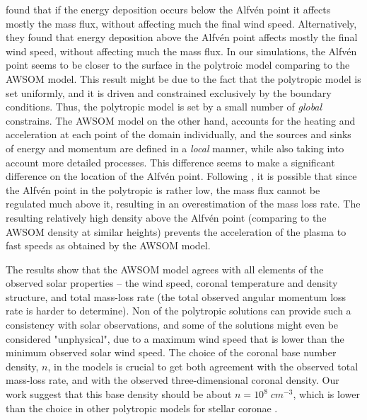 \documentclass[apj]{emulateapj}
\begin{document}
\cite{LeerHolzer80} found that if the energy deposition occurs below the Alfv\'en point it affects mostly the mass flux, without affecting much the final wind speed. Alternatively, they found that energy deposition above the Alfv\'en point affects mostly the final wind speed, without affecting much the mass flux. In our simulations, the Alfv\'en point seems to be closer to the surface in the polytroic model comparing to the AWSOM model. This result might be due to the fact that the polytropic model is set uniformly, and it is driven and constrained exclusively by the boundary conditions. Thus, the polytropic model is set by a small number of {\it global} constrains. The AWSOM model on the other hand, accounts for the heating and acceleration at each point of the domain individually, and the sources and sinks of energy and momentum are defined in a {\it local} manner, while also taking into account more detailed processes. This difference seems to make a significant difference on the location of the Alfv\'en point. Following \cite{LeerHolzer80}, it is possible that since the Alfv\'en point in the polytropic is rather low, the mass flux cannot be regulated much above it, resulting in an overestimation of the mass loss rate. The resulting relatively high density above the Alfv\'en point (comparing to the AWSOM density at similar heights) prevents the acceleration of the plasma to fast speeds as obtained by the AWSOM model.

The results show that the AWSOM model agrees with all elements of the observed solar properties -- the wind speed, coronal temperature and density structure, and total mass-loss rate (the total observed angular momentum loss rate is harder to determine). Non of the polytropic solutions can provide such a consistency with solar observations, and some of the solutions might even be considered "unphysical", due to a maximum wind speed that is lower than the minimum observed solar wind speed. The choice of the coronal base number density, $n$, in the models is crucial to get both agreement with the observed total mass-loss rate, and with the observed three-dimensional coronal density. Our work suggest that this base density should be about $n=10^8\;cm^{-3}$, which is lower than the choice in other polytropic models for stellar coronae \citep[e.g.,][]{Vidotto15,Reville15}. 
\end{document}
